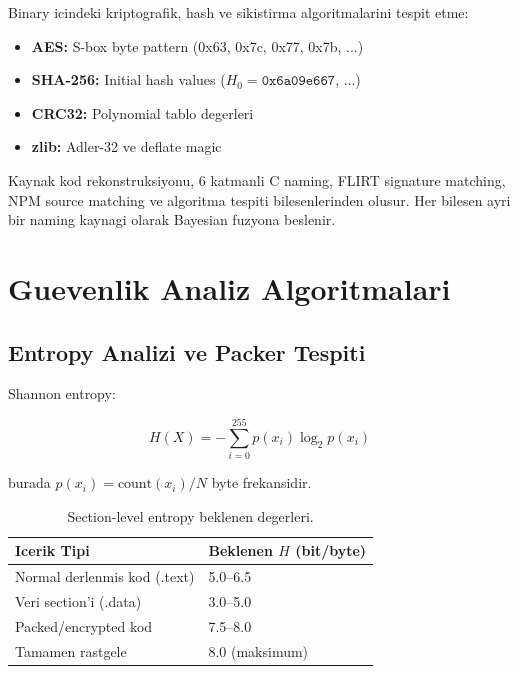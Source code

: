 \documentclass[12pt,a4paper,oneside]{book}
\theoremstyle{definition}
\begin{document}
Binary icindeki kriptografik, hash ve sikistirma algoritmalarini tespit etme:

\begin{itemize}
\item \textbf{AES:} S-box byte pattern (0x63, 0x7c, 0x77, 0x7b, ...)
\item \textbf{SHA-256:} Initial hash values ($H_0 = \texttt{0x6a09e667}$, ...)
\item \textbf{CRC32:} Polynomial tablo degerleri
\item \textbf{zlib:} Adler-32 ve deflate magic
\end{itemize}

\begin{ozet}
Kaynak kod rekonstruksiyonu, 6 katmanli C naming, FLIRT signature matching, NPM source matching ve algoritma tespiti bilesenlerin\-den olusur. Her bilesen ayri bir naming kaynagi olarak Bayesian fuzyona beslenir.
\end{ozet}




\chapter{Guevenlik Analiz Algoritmalari}
\label{ch:security}

\section{Entropy Analizi ve Packer Tespiti}
\label{sec:entropy}

Shannon entropy:

\begin{equation}
H(X) = -\sum_{i=0}^{255} p(x_i) \log_2 p(x_i)
\label{eq:entropy}
\end{equation}

burada $p(x_i) = \text{count}(x_i) / N$ byte frekansidir.

\begin{table}[h]
\centering
\begin{tabular}{ll}
\toprule
\textbf{\color{sectioncyan}Icerik Tipi} & \textbf{\color{sectioncyan}Beklenen $H$ (bit/byte)} \\
\midrule
Normal derlenmi\-s kod (.text) & 5.0--6.5 \\
Veri section'i (.data) & 3.0--5.0 \\
Packed/encrypted kod & 7.5--8.0 \\
Tamamen rastgele & 8.0 (maksimum) \\
\bottomrule
\end{tabular}
\caption{Section-level entropy beklenen degerleri.}
\label{tab:entropy}
\end{table}
\end{document}
